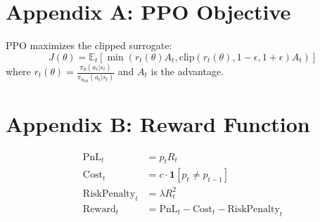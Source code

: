 \documentclass[12pt]{article}
\begin{document}
\appendix
\section*{Appendix A: PPO Objective}
PPO maximizes the clipped surrogate:
\begin{equation}
J(\theta) = \mathbb{E}_t \left[ \min \left( r_t(\theta) A_t , \text{clip}(r_t(\theta), 1-\epsilon, 1+\epsilon) A_t \right) \right]
\end{equation}
where $r_t(\theta) = \frac{\pi_\theta(a_t|s_t)}{\pi_{\theta_{\text{old}}}(a_t|s_t)}$ and $A_t$ is the advantage.

\section*{Appendix B: Reward Function}
\begin{align}
\text{PnL}_t &= p_t R_t \\
\text{Cost}_t &= c \cdot \mathbf{1}[p_t \neq p_{t-1}] \\
\text{RiskPenalty}_t &= \lambda R_t^2 \\
\text{Reward}_t &= \text{PnL}_t - \text{Cost}_t - \text{RiskPenalty}_t
\end{align}



\end{document}
